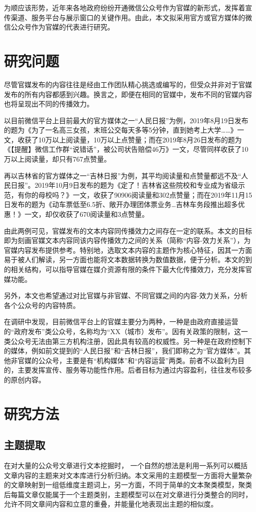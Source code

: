 \documentclass[a4paper,12pt,UTF8]{article}
\begin{document}
    为顺应该形势，近年来各地政府纷纷开通微信公众号作为官媒的新形式，发挥着宣传渠道、服务平台与展示窗口的关键作用。由此，本文拟采用官方或官方媒体的微信公众号作为官媒的代表进行研究。

    \section{研究问题}
    尽管官媒发布的内容往往是经由工作团队精心挑选或编写的，但受众并非对于官媒发布的所有内容都感到兴趣。换言之，即便在相同的官媒中，发布不同的官媒内容也将呈现出不同的传播效力。

    以目前微信平台上目前最大的官方媒体之一“人民日报”为例，2019年8月19日发布的题为《为了一名高三女孩，末班公交每天多等5分钟，直到她考上大学……》一文，收获了10万以上阅读量，10万以上点赞量；而在2019年8月26日发布的题为《【提醒】微信工作群“说错话”，被公司状告赔偿46万》一文，尽管同样收获了10万以上阅读量，却只有767点赞量。
    
    再以吉林省的官方媒体之一“吉林日报”为例，其平均阅读量和点赞量都远不及“人民日报”。2019年10月9日发布的题为《定了！吉林省这些院校和专业成为省级示范，有你的母校吗？》一文，收获了90906阅读量和302点赞量；而在2019年11月15日发布的题为《动车票低至6.5折、敞开办理团体票业务…吉林车务段推出超多优惠！》一文，却仅收获了670阅读量和3点赞量。
    
    由此两例可见，官媒发布的文本内容同传播效力之间存在一定的联系。本文的目标即为刻画官媒文本内容同该内容传播效力之间的关系（简称“内容-效力关系”），为官媒内容发布提供参考。特别地，选取文本内容的主题作为核心特征，因其一方面易于被人们解读，另一方面也能将文本数据转换为数值数据，便于分析。本文的到的相关结构，可以指导官媒在媒介资源有限的条件下最大化传播效力，充分发挥官媒功能。

    另外，本文也希望通过对比官媒与非官媒、不同官媒之间的内容-效力关系，分析各个公众号的内容特质。

    在调研中发现，目前微信平台上的官媒主要分为两种，一种是由政府直接运营的“政府发布”类公众号，名称均为“XX（城市）发布”。因有关政策的限制，这一类公众号无法由第三方机构注册，因此具有较高的权威性。另一种是在政府控制下的媒体，例如前文提到的“人民日报”和“吉林日报”，我们即称之为“官方媒体”。其他非官媒的公众号，主要是有“机构媒体”和“内容运营”两类。前者不以盈利为目的，主要发挥宣传、服务等功能性作用。后者目标为通过内容盈利，往往发布较多的原创内容。
    \section{研究方法}
    \subsection{主题提取}
    在对大量的公众号文章进行文本挖掘时， 一个自然的想法是利用一系列可以概括文章内容的主题来对文本库进行分析归纳。本文采用的主题模型一方面将大量繁杂的文章映射到一组低维度主题词上，另一方面，不同于简单的文本聚类模型，聚类后每篇文章仅能属于一个主题类别，主题模型可以在对文章进行分类整合的同时，允许不同文章间内容和立意的重叠，并能量化地表现出主题的相似度。
\end{document}
